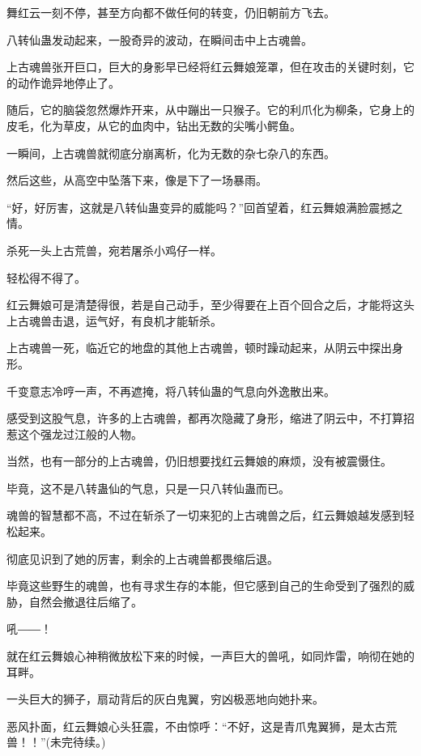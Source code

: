 \begin{this_body}
舞红云一刻不停，甚至方向都不做任何的转变，仍旧朝前方飞去。

八转仙蛊发动起来，一股奇异的波动，在瞬间击中上古魂兽。

上古魂兽张开巨口，巨大的身影早已经将红云舞娘笼罩，但在攻击的关键时刻，它的动作诡异地停止了。

随后，它的脑袋忽然爆炸开来，从中蹦出一只猴子。它的利爪化为柳条，它身上的皮毛，化为草皮，从它的血肉中，钻出无数的尖嘴小鳄鱼。

一瞬间，上古魂兽就彻底分崩离析，化为无数的杂七杂八的东西。

然后这些，从高空中坠落下来，像是下了一场暴雨。

“好，好厉害，这就是八转仙蛊变异的威能吗？”回首望着，红云舞娘满脸震撼之情。

杀死一头上古荒兽，宛若屠杀小鸡仔一样。

轻松得不得了。

红云舞娘可是清楚得很，若是自己动手，至少得要在上百个回合之后，才能将这头上古魂兽击退，运气好，有良机才能斩杀。

上古魂兽一死，临近它的地盘的其他上古魂兽，顿时躁动起来，从阴云中探出身形。

千变意志冷哼一声，不再遮掩，将八转仙蛊的气息向外逸散出来。

感受到这股气息，许多的上古魂兽，都再次隐藏了身形，缩进了阴云中，不打算招惹这个强龙过江般的人物。

当然，也有一部分的上古魂兽，仍旧想要找红云舞娘的麻烦，没有被震慑住。

毕竟，这不是八转蛊仙的气息，只是一只八转仙蛊而已。

魂兽的智慧都不高，不过在斩杀了一切来犯的上古魂兽之后，红云舞娘越发感到轻松起来。

彻底见识到了她的厉害，剩余的上古魂兽都畏缩后退。

毕竟这些野生的魂兽，也有寻求生存的本能，但它感到自己的生命受到了强烈的威胁，自然会撤退往后缩了。

吼――！

就在红云舞娘心神稍微放松下来的时候，一声巨大的兽吼，如同炸雷，响彻在她的耳畔。

一头巨大的狮子，扇动背后的灰白鬼翼，穷凶极恶地向她扑来。

恶风扑面，红云舞娘心头狂震，不由惊呼：“不好，这是青爪鬼翼狮，是太古荒兽！！”(未完待续。)

\end{this_body}

